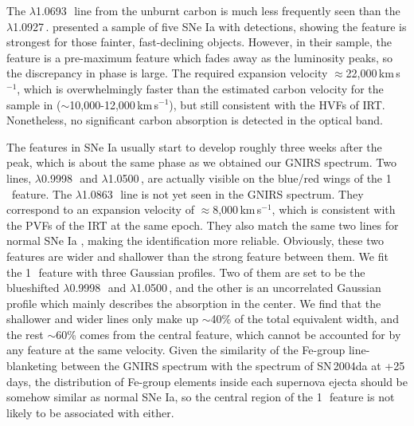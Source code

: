 \documentclass[twocolumn]{aastex631}
\begin{document}
The  $\lambda$1.0693\,\micron\ line from the unburnt carbon is much less frequently seen than the  $\lambda$1.0927\,\micron. \citet{Hsiao_CSP_2019} presented a sample of five SNe Ia with  detections, showing the  feature is strongest for those fainter, fast-declining objects. However, in their sample, the  feature is a pre-maximum feature which fades away as the luminosity peaks, so the discrepancy in phase is large. The required expansion velocity $\approx$22,000\,km\,s$^{-1}$, which is overwhelmingly faster than the estimated carbon velocity for the sample in \citet{Hsiao_CSP_2019} ($\sim$10,000-12,000\,km\,s$^{-1}$), but still consistent with the HVFs of  IRT. Nonetheless, no significant carbon absorption is detected in the optical band.

The  features in SNe Ia usually start to develop roughly three weeks after the peak, which is about the same phase as we obtained our GNIRS spectrum. Two  lines, $\lambda$0.9998\,\micron\ and $\lambda$1.0500\,\micron, are actually visible on the blue/red wings of the 1\,\micron\ feature. The  $\lambda$1.0863\,\micron\ line is not yet seen in the GNIRS spectrum. They correspond to an expansion velocity of $\approx$8,000\,km\,s$^{-1}$, which is consistent with the PVFs of the  IRT at the same epoch. They also match the same two lines for normal SNe Ia \citep{Marion2009_NIR}, making the identification more reliable. Obviously, these two  features are wider and shallower than the strong feature between them. We fit the 1\,\micron\ feature with three Gaussian profiles. Two of them are set to be the blueshifted  $\lambda$0.9998\,\micron\ and $\lambda$1.0500\,\micron, and the other is an uncorrelated Gaussian profile which mainly describes the absorption in the center. We find that the shallower and wider  lines only make up $\sim$40\% of the total equivalent width, and the rest $\sim$60\% comes from the central feature, which cannot be accounted for by any  feature at the same velocity. Given the similarity of the Fe-group line-blanketing between the GNIRS spectrum with the spectrum of SN\,2004da at +25\,days, the distribution of Fe-group elements inside each supernova ejecta should be somehow similar as normal SNe Ia, so the central region of the 1\,\micron\ feature is not likely to be associated with  either.
\end{document}
